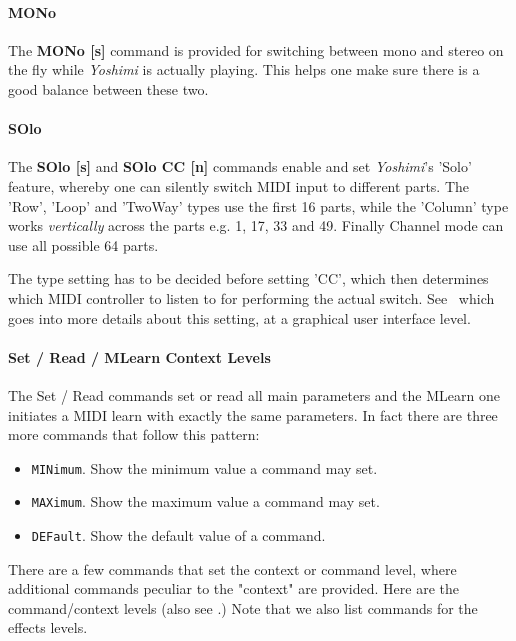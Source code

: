 \paragraph{MONo}
\label{paragraph:command_line_mono}
    The \textbf{MONo [s]} command is provided for switching between mono and
    stereo on the fly while \textsl{Yoshimi} is actually playing. This helps
    one make sure there is a good balance between these two.

\paragraph{SOlo}
\label{paragraph:command_line_solo}
   The \textbf{SOlo [s]} and \textbf{SOlo CC [n]}
   commands enable and set \textsl{Yoshimi}'s 'Solo' feature, whereby one can
   silently switch MIDI input to different parts.
   The 'Row', 'Loop' and 'TwoWay' types use the first 16 parts, while the
   'Column' type works \textsl{vertically} across the parts e.g. 1, 17, 33
   and 49. Finally Channel mode can use all possible 64 parts.

   The type setting has to be decided before setting 'CC', which then
   determines which MIDI controller to listen to for performing the actual
   switch. See ~which goes into more
   details about this setting, at a graphical user interface level.

\paragraph{Set / Read / MLearn Context Levels}
\label{paragraph:command_line_context_levels}

   The Set / Read commands set or read all main parameters and the MLearn one
   initiates a MIDI learn with exactly the same parameters.
   In fact there are three more commands that follow this pattern:

   \begin{itemize}
   \item \texttt{MINimum}. Show the minimum value a command may set.
   \item \texttt{MAXimum}. Show the maximum value a command may set.
   \item \texttt{DEFault}. Show the default value of a command.
   \end{itemize}

   There are a few commands that set the context or command level, where
   additional commands peculiar to the "context" are provided.  Here are the
   command/context levels
   (also see .)
   Note that we also list commands for the effects levels.

